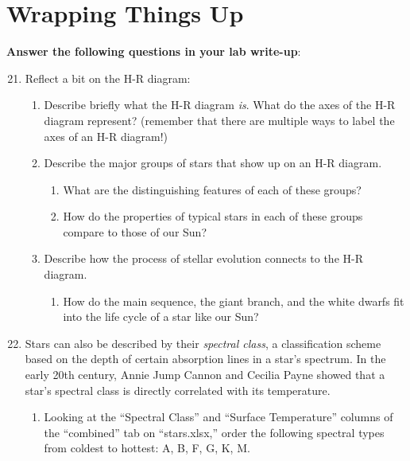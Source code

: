 \documentclass[11pt]{article}
\begin{document}
\section{Wrapping Things Up}
\textbf{Answer the following questions in your lab write-up}:
\begin{enumerate}
\setcounter{enumi}{20}

    \item Reflect a bit on the H-R diagram:
    \begin{enumerate}
        \item Describe briefly what the H-R diagram \emph{is}. What do the axes of the H-R diagram represent? (remember that there are multiple ways to label the axes of an H-R diagram!)
        
        \item Describe the major groups of stars that show up on an H-R diagram. 
        \begin{enumerate}
            \item What are the distinguishing features of each of these groups?
            
            \item How do the properties of typical stars in each of these groups compare to those of our Sun?
        \end{enumerate} 
        
        \item Describe how the process of stellar evolution connects to the H-R diagram.
        \begin{enumerate}
            \item How do the main sequence, the giant branch, and the white dwarfs fit into the life cycle of a star like our Sun?
        \end{enumerate}
        
    \end{enumerate}
    
    \item Stars can also be described by their \emph{spectral class}, a classification scheme based on the depth of certain absorption lines in a star's spectrum. In the early 20th century, Annie Jump Cannon and Cecilia Payne showed that a star's spectral class is directly correlated with its temperature.
    \begin{enumerate}
        \item Looking at the ``Spectral Class'' and ``Surface Temperature'' columns of the ``combined'' tab on ``stars.xlsx,'' order the following spectral types from coldest to hottest: A, B, F, G, K, M.
        

\end{enumerate}
\end{enumerate}
\end{document}
